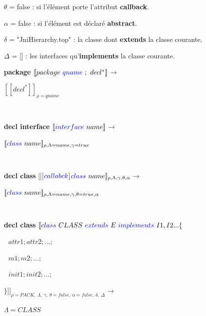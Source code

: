 \documentclass[a4paper, 11pt, notitlepage]{article}
\begin{document}
$\theta$ = false : si l'élément porte l'attribut \textbf{callback}.

$\alpha$ = false : si l'élément est déclaré \textbf{abstract}.

$\delta$ = "JniHierarchy.top" : la classe dont \textbf{extends} la classe courante.

$\Delta$ = [] : les interfaces qu'\textbf{implements} la classe courante.
\ %
\newline
\noindent


\textbf{package}
\newline
\noindent
$[\![ package\ {\color{blue}qname}\ ;\ decl^* ]\!]$$\longrightarrow$

$[\![ decl^* ]\!]_{\rho=qname}$ 

\ 
\newline

\textbf{ decl interface }
\newline
\noindent
$[\![{\color{blue}interface}\  name ]\!]$$\longrightarrow$

$[\![{\color{blue}class}\  name ]\!]_{\rho,\Lambda=name,\gamma=true}$

\ 
\newline

\textbf{ decl class }
\newline
\noindent
$[\![$[$ {\color{blue}callabck}$]${\color{blue} class}\  name ]\!]_{\rho,\Lambda,\gamma,\theta,\alpha}$$\longrightarrow$

$[\![{\color{blue}class}\  name ]\!]_{\rho,\Lambda=name,\gamma,\theta=true,\alpha}$

\ 
\newpage
\noindent

\textbf{ decl class}
\newline
\noindent
$[\![ {\color{blue}class}\ CLASS\ 
 {\color{blue}extends}\  E \ 
 {\color{blue}implements}\  I1,I2... \{$

 $ \ \ \ attr1; attr2; ...;$

  $\ \ \ m1; m2; ...;$

  $\ \ \ init1; init2; ...;$

 $\} ]\!]_{\rho=PACK,\ \Lambda,\ \gamma,\ \theta=false,\ \alpha=false,\ \delta,\ \Delta}\longrightarrow$
\ 
\newline

$\Lambda=CLASS$
\end{document}
